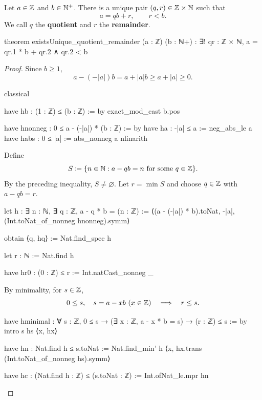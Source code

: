 \begin{theorem}
  \label{ent:thm:division-algorithm}
  Let $a\in\mathbb{Z}$ and $b\in\mathbb{N}^+$.
  There is a unique pair $(q,r)\in\mathbb{Z}\times\mathbb{N}$ such that
  \[
    a=qb+r, \qquad r<b.
  \]
  We call $q$ the \textbf{quotient} and $r$ the \textbf{remainder}.

  \begin{lean}
    theorem existsUnique_quotient_remainder (a : ℤ) (b : ℕ+) :
        ∃! qr : ℤ × ℕ,
          a = qr.1 * b + qr.2 ∧ qr.2 < b
  \end{lean}
\end{theorem}

\begin{proof}
  Since $b\ge1$,
  \[
    a-(-|a|)b=a+|a|b\ge a+|a|\ge0.
  \]

  \begin{lean}
    classical

    have hb : (1 : ℤ) ≤ (b : ℤ) := by
      exact_mod_cast b.pos

    have hnonneg : 0 ≤ a - (-|a|) * (b : ℤ) := by
      have ha : -|a| ≤ a := neg_abs_le a
      have habs : 0 ≤ |a| := abs_nonneg a
      nlinarith
  \end{lean}

  Define
  \[
    S\coloneqq\{n\in\mathbb{N}: a-qb=n\text{ for some }q\in\mathbb{Z}\}.
  \]
  By the preceding inequality, $S\ne\varnothing$.
  Let $r=\min S$ and choose $q\in\mathbb{Z}$ with $a-qb=r$.

  \begin{lean}
    let h : ∃ n : ℕ, ∃ q : ℤ, a - q * b = (n : ℤ) :=
      ⟨(a - (-|a|) * b).toNat, -|a|, (Int.toNat_of_nonneg hnonneg).symm⟩

    obtain ⟨q, hq⟩ := Nat.find_spec h

    let r : ℕ := Nat.find h

    have hr0 : (0 : ℤ) ≤ r := Int.natCast_nonneg _
  \end{lean}

  By minimality, for $s\in\mathbb{Z}$,
  \[
    0\le s,\quad s=a-xb\ (x\in\Z)\quad\Longrightarrow\quad r\le s.
  \]

  \begin{lean}
    have hminimal :
        ∀ s : ℤ, 0 ≤ s → (∃ x : ℤ, a - x * b = s) → (r : ℤ) ≤ s := by
      intro s hs ⟨x, hx⟩

      have hn : Nat.find h ≤ s.toNat :=
        Nat.find_min' h ⟨x, hx.trans (Int.toNat_of_nonneg hs).symm⟩

      have hc : (Nat.find h : ℤ) ≤ (s.toNat : ℤ) :=
        Int.ofNat_le.mpr hn


\end{lean}
\end{proof}
